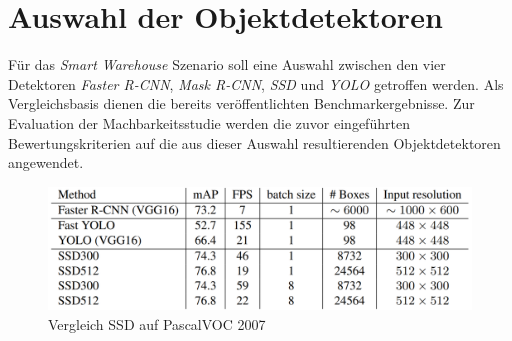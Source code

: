 \section{Auswahl der Objektdetektoren} \label{detect}

Für das \textit{Smart Warehouse} Szenario soll eine Auswahl zwischen den vier Detektoren \textit{Faster R-CNN}, \textit{Mask R-CNN}, \textit{SSD} und \textit{YOLO} getroffen werden. Als Vergleichsbasis dienen die bereits veröffentlichten Benchmarkergebnisse. Zur Evaluation der Machbarkeitsstudie werden die zuvor eingeführten Bewertungskriterien auf die aus dieser Auswahl resultierenden Objektdetektoren angewendet.

\begin{figure}[ht]
	\begin{center}
		\includegraphics[width=12cm]{Bilder/ssd_results.png} 
		\caption[Vergleich SSD auf PascalVOC 2007]{Vergleich SSD auf PascalVOC 2007\footnotemark \cite{ssd.20161229}}
		\label{result}
	\end{center}
\end{figure}

